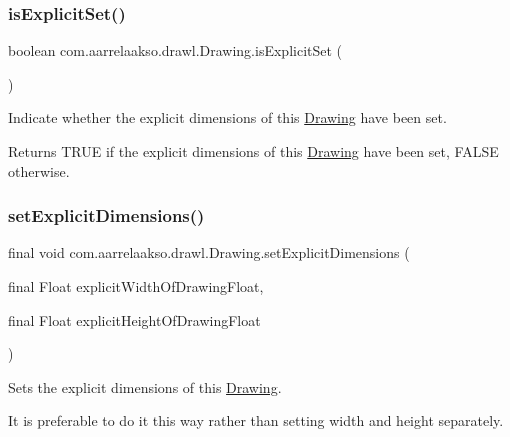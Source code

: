 \subsubsection{\texorpdfstring{is\+Explicit\+Set()}{isExplicitSet()}}
{\footnotesize\ttfamily boolean com.\+aarrelaakso.\+drawl.\+Drawing.\+is\+Explicit\+Set (\begin{DoxyParamCaption}{ }\end{DoxyParamCaption})\hspace{0.3cm}{\ttfamily [private]}}



Indicate whether the explicit dimensions of this \hyperlink{classcom_1_1aarrelaakso_1_1drawl_1_1_drawing}{Drawing} have been set. 

\begin{DoxyReturn}{Returns}
{\ttfamily T\+R\+UE} if the explicit dimensions of this \hyperlink{classcom_1_1aarrelaakso_1_1drawl_1_1_drawing}{Drawing} have been set, {\ttfamily F\+A\+L\+SE} otherwise. 
\end{DoxyReturn}
\mbox{\label{classcom_1_1aarrelaakso_1_1drawl_1_1_drawing_a4ac8a97ae89af08cf9ab01dbbe3dc010}} 
\subsubsection{\texorpdfstring{set\+Explicit\+Dimensions()}{setExplicitDimensions()}\hspace{0.1cm}{\footnotesize\ttfamily [1/2]}}
{\footnotesize\ttfamily final void com.\+aarrelaakso.\+drawl.\+Drawing.\+set\+Explicit\+Dimensions (\begin{DoxyParamCaption}\item[{final Float}]{explicit\+Width\+Of\+Drawing\+Float,  }\item[{final Float}]{explicit\+Height\+Of\+Drawing\+Float }\end{DoxyParamCaption})}



Sets the explicit dimensions of this \hyperlink{classcom_1_1aarrelaakso_1_1drawl_1_1_drawing}{Drawing}. 

It is preferable to do it this way rather than setting width and height separately.


